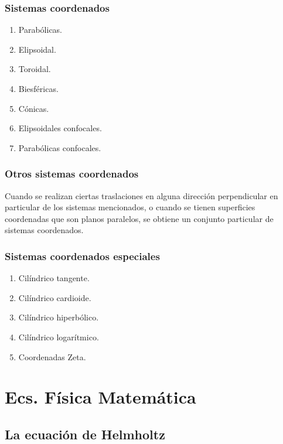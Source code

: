 \documentclass[12pt]{beamer}
\begin{document}
\begin{frame}
\frametitle{Sistemas coordenados}
\begin{enumerate}[<+->]
\conti
\item Parabólicas.
\item Elipsoidal.
\item Toroidal.
\item Biesféricas.
\item Cónicas.
\item Elipsoidales confocales.
\item Parabólicas confocales.
\end{enumerate}
\end{frame}
\begin{frame}
\frametitle{Otros sistemas coordenados}
Cuando se realizan ciertas traslaciones en alguna dirección perpendicular en particular de los sistemas mencionados, o cuando se tienen superficies coordenadas que son planos paralelos, \pause se obtiene un conjunto particular de sistemas coordenados.
\end{frame}
\begin{frame}
\frametitle{Sistemas coordenados especiales}
\begin{enumerate}[<+->]
\item Cilíndrico tangente.
\item Cilíndrico cardioide.
\item Cilíndrico hiperbólico.
\item Cilíndrico logarítmico.
\item Coordenadas Zeta.
\end{enumerate}
\end{frame}

\section{Ecs. Física Matemática}
\subsection{La ecuación de Helmholtz}
\end{document}
